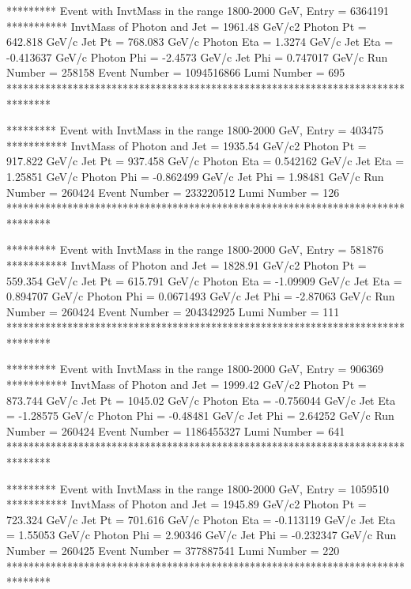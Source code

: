                                                                      
********* Event with InvtMass in the range 1800-2000 GeV, Entry = 6364191 ***********
InvtMass of Photon and Jet = 1961.48 GeV/c2
Photon Pt = 642.818 GeV/c
Jet Pt = 768.083 GeV/c
Photon Eta = 1.3274 GeV/c
Jet Eta = -0.413637 GeV/c
Photon Phi = -2.4573 GeV/c
Jet Phi = 0.747017 GeV/c
Run Number = 258158
Event Number = 1094516866
Lumi Number = 695
********************************************************************************
                                                                     
                                                                     
********* Event with InvtMass in the range 1800-2000 GeV, Entry = 403475 ***********
InvtMass of Photon and Jet = 1935.54 GeV/c2
Photon Pt = 917.822 GeV/c
Jet Pt = 937.458 GeV/c
Photon Eta = 0.542162 GeV/c
Jet Eta = 1.25851 GeV/c
Photon Phi = -0.862499 GeV/c
Jet Phi = 1.98481 GeV/c
Run Number = 260424
Event Number = 233220512
Lumi Number = 126
********************************************************************************
                                                                     
                                                                     
********* Event with InvtMass in the range 1800-2000 GeV, Entry = 581876 ***********
InvtMass of Photon and Jet = 1828.91 GeV/c2
Photon Pt = 559.354 GeV/c
Jet Pt = 615.791 GeV/c
Photon Eta = -1.09909 GeV/c
Jet Eta = 0.894707 GeV/c
Photon Phi = 0.0671493 GeV/c
Jet Phi = -2.87063 GeV/c
Run Number = 260424
Event Number = 204342925
Lumi Number = 111
********************************************************************************
                                                                     
                                                                     
********* Event with InvtMass in the range 1800-2000 GeV, Entry = 906369 ***********
InvtMass of Photon and Jet = 1999.42 GeV/c2
Photon Pt = 873.744 GeV/c
Jet Pt = 1045.02 GeV/c
Photon Eta = -0.756044 GeV/c
Jet Eta = -1.28575 GeV/c
Photon Phi = -0.48481 GeV/c
Jet Phi = 2.64252 GeV/c
Run Number = 260424
Event Number = 1186455327
Lumi Number = 641
********************************************************************************
                                                                     
                                                                     
********* Event with InvtMass in the range 1800-2000 GeV, Entry = 1059510 ***********
InvtMass of Photon and Jet = 1945.89 GeV/c2
Photon Pt = 723.324 GeV/c
Jet Pt = 701.616 GeV/c
Photon Eta = -0.113119 GeV/c
Jet Eta = 1.55053 GeV/c
Photon Phi = 2.90346 GeV/c
Jet Phi = -0.232347 GeV/c
Run Number = 260425
Event Number = 377887541
Lumi Number = 220
********************************************************************************
                                                                     
